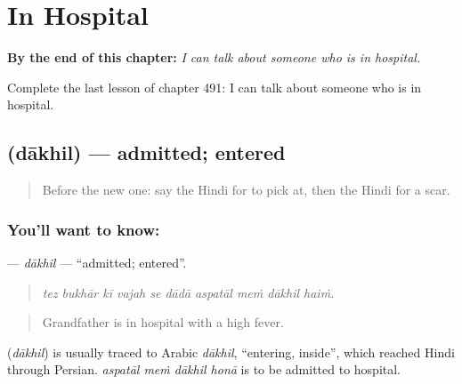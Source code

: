 
\chapter{In Hospital}
\label{ch:hi-in-hospital}

\begin{chapteropening}
\textbf{By the end of this chapter:} \emph{I can talk about someone who is in hospital.}

Complete the last lesson of chapter 491: I can talk about someone who is in hospital.
\end{chapteropening}

\section[\texorpdfstring{\hi{दाख़िल} (dākhil)}{दाख़िल (dākhil)}]{ (dākhil) — admitted; entered}

\label{lesson:HI-C491-dakhil}



\begin{quote}
Before the new one: say the Hindi for to pick at, then the Hindi for a scar.
\end{quote}

\subsection*{You'll want to know: }
\textbf{} — \emph{dākhil} — \textquotedblleft{}admitted; entered\textquotedblright{}.

\begin{quote}
         
\end{quote}

\begin{quote}
\emph{tez bukhār kī vajah se dādā aspatāl meṁ dākhil haiṁ.}
\end{quote}

\begin{quote}
Grandfather is in hospital with a high fever.
\end{quote}

\begin{cousinweb}
\textbf{} (\emph{dākhil}) is usually traced to Arabic \emph{dākhil}, \textquotedblleft{}entering, inside\textquotedblright{}, which reached Hindi through Persian. \emph{aspatāl meṁ dākhil honā} is to be admitted to hospital.
\end{cousinweb}

